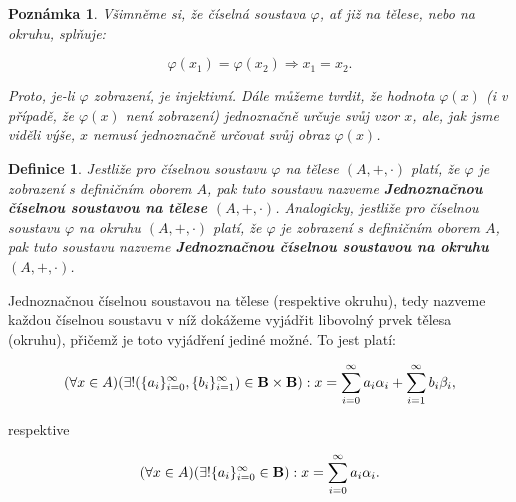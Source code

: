 \documentclass[12pt]{book}
\newtheorem{definice}{Definice}
\newtheorem{pozn}{Poznámka}
\begin{document}
\begin{pozn}
Všimněme si, že číselná soustava $\varphi$, ať již na tělese, nebo na okruhu, splňuje:

$$\varphi (x_1) = \varphi(x_2) \Rightarrow x_1 = x_2.$$

Proto, je-li $\varphi$ zobrazení, je injektivní.
Dále můžeme tvrdit, že hodnota $\varphi(x)$ (i v případě, že $\varphi(x)$ není zobrazení) jednoznačně určuje svůj vzor $x$, ale, jak jsme viděli výše, $x$ nemusí jednoznačně určovat svůj obraz $\varphi(x)$.

\end{pozn}


	\begin{definice}
		Jestliže pro číselnou soustavu $\varphi$ na tělese $(A,+,\cdot)$ platí, že $\varphi$ je zobrazení s definičním oborem $A$, pak tuto soustavu nazveme \textbf{Jednoznačnou číselnou soustavou na tělese $(A,+,\cdot)$}. Analogicky, jestliže pro číselnou soustavu $\varphi$ na okruhu $(A,+,\cdot)$ platí, že $\varphi$ je zobrazení s definičním oborem $A$, pak tuto soustavu nazveme \textbf{Jednoznačnou číselnou soustavou na okruhu $(A,+,\cdot)$}.
	\end{definice}

Jednoznačnou číselnou soustavou na tělese (respektive okruhu), tedy nazveme každou číselnou soustavu v níž dokážeme vyjádřit libovolný prvek tělesa (okruhu), přičemž je toto vyjádření jediné možné. To jest platí:	

$$(\forall x \in A) (\exists!(\{a_i\}_{i=0}^{\infty},\{b_i\}_{i=1}^{\infty})\in\textbf{B}\times\textbf{B}): x = \sum_{i=0}^{\infty} a_{i}\alpha_{i} + \sum_{i=1}^{\infty} b_{i}\beta_{i},$$

respektive

$$(\forall x \in A) (\exists! \{a_i\}_{i=0}^{\infty} \in \textbf{B}): x = \sum_{i=0}^{\infty} a_{i}\alpha_{i}.$$
\end{document}
